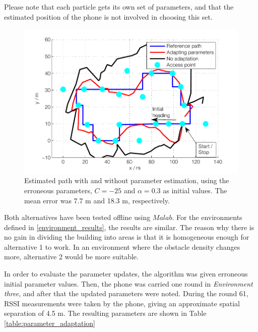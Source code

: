 \documentclass{LTHthesis}
\begin{document}
Please note that each particle gets its own set of parameters, and that the estimated position of the phone is not involved in choosing this set.
%
\begin{figure}[!hbt]

\includegraphics[width=1\textwidth ]{images/adapt_parameters/adaptation_vs_none}
\caption{Estimated path with and without parameter estimation, using the erroneous parameters, $C=-25$ and $\alpha=0.3$ as initial values. The mean error was 7.7 m and 18.3 m, respectively.}
\label{adaptation_vs_none}
\end{figure}
%
Both alternatives have been tested offline using $Malab$. For the environments defined in \ref{environment_results}, the results are similar. The reason why there is no gain in dividing the building into areas is that it is homogeneous enough for alternative 1 to work. In an environment where the obstacle density changes more, alternative 2 would be more suitable.

In order to evaluate the parameter updates, the algorithm was given erroneous initial parameter values. Then, the phone was carried one round in \emph{Environment three}, and after that the updated parameters were noted. During the round 61, RSSI measurements were taken by the phone, giving an approximate spatial separation of 4.5 m. The resulting parameters are shown in Table \ref{table:parameter_adaptation}
\end{document}
